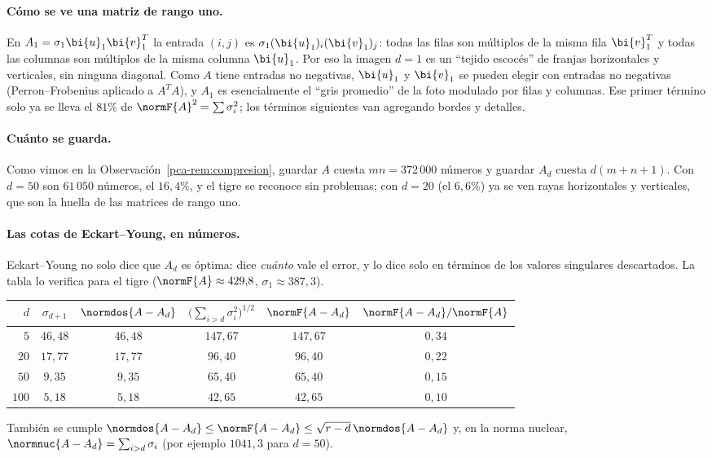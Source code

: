 \paragraph{Cómo se ve una matriz de rango uno.}
En $A_1=\sigma_1\bi{u}_1\bi{v}_1^T$ la entrada $(i,j)$ es $\sigma_1(\bi{u}_1)_i(\bi{v}_1)_j$:
todas las filas son múltiplos de la misma fila $\bi{v}_1^T$ y todas las
columnas son múltiplos de la misma columna $\bi{u}_1$. Por eso la imagen $d=1$ es
un ``tejido escocés'' de franjas horizontales y verticales, sin ninguna
diagonal. Como $A$ tiene entradas no negativas, $\bi{u}_1$ y $\bi{v}_1$ se pueden
elegir con entradas no negativas (Perron--Frobenius aplicado a $A^T A$),
y $A_1$ es esencialmente el ``gris promedio'' de la foto modulado por filas y
columnas. Ese primer término solo ya se lleva el $81\%$ de
$\normF{A}^2=\sum\sigma_i^2$; los términos siguientes van agregando bordes y
detalles.

\paragraph{Cuánto se guarda.}
Como vimos en la Observación~\ref{pca-rem:compresion}, guardar $A$ cuesta
$mn=372\,000$ números y guardar $A_d$ cuesta $d(m+n+1)$. Con $d=50$ son
$61\,050$ números, el $16{,}4\%$, y el tigre se reconoce sin problemas; con
$d=20$ (el $6{,}6\%$) ya se ven rayas horizontales y verticales, que son la
huella de las matrices de rango uno.

\paragraph{Las cotas de Eckart--Young, en números.}
Eckart--Young no solo dice que $A_d$ es óptima: dice \emph{cuánto} vale el
error, y lo dice solo en términos de los valores singulares descartados. La
tabla lo verifica para el tigre ($\normF{A}\approx429{,}8$, $\sigma_1\approx387{,}3$).
\begin{center}
\renewcommand{\arraystretch}{1.25}
\begin{tabular}{r|cc|cc|c}
$d$ & $\sigma_{d+1}$ & $\normdos{A-A_d}$ & $\bigl(\sum_{i>d}\sigma_i^2\bigr)^{1/2}$
& $\normF{A-A_d}$ & $\normF{A-A_d}/\normF{A}$\\\hline
$5$   & $46{,}48$ & $46{,}48$ & $147{,}67$ & $147{,}67$ & $0{,}34$\\
$20$  & $17{,}77$ & $17{,}77$ & $96{,}40$  & $96{,}40$  & $0{,}22$\\
$50$  & $9{,}35$  & $9{,}35$  & $65{,}40$  & $65{,}40$  & $0{,}15$\\
$100$ & $5{,}18$  & $5{,}18$  & $42{,}65$  & $42{,}65$  & $0{,}10$
\end{tabular}
\end{center}
También se cumple $\normdos{A-A_d}\le\normF{A-A_d}\le\sqrt{r-d}\,\normdos{A-A_d}$
y, en la norma nuclear, $\normnuc{A-A_d}=\sum_{i>d}\sigma_i$ (por ejemplo
$1041{,}3$ para $d=50$).

